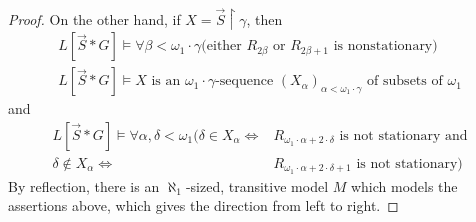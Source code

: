 \documentclass[10pt,a4paper]{amsart}
\begin{document}
\begin{proof}
On the other hand, if $X=\vec{S} \upharpoonright \gamma$, then
\begin{align*}
L[\vec{S} \ast G] \models \forall \beta< \omega_1 \cdot \gamma (\text{either  $R_{2\beta}$ or $R_{2\beta+1}$ is nonstationary) } \\ 
L[\vec{S} \ast G]  \models X \text{ is an $\omega_1 \cdot \gamma$-sequence $(X_{\alpha})_{\alpha < \omega_1 \cdot \gamma}$ of subsets of $\omega_1$}
\end{align*}
and
\begin{align*}
L[\vec{S} \ast G] \models  \forall \alpha, \delta < \omega_1 (\delta  \in X_{\alpha} \Leftrightarrow & R_{\omega_1 \cdot \alpha + 2 \cdot \delta } \text{ is not stationary and} \\ 
\delta  \notin X_{\alpha} \Leftrightarrow&  R_{\omega_1 \cdot \alpha + 2 \cdot \delta +1} \text{ is not stationary})
\end{align*}
By reflection, there is an $\aleph_1$-sized, transitive model $M$ which models the assertions above, which gives the direction from left to right.

\end{proof}
\end{document}
